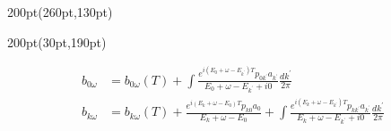 \begin{frame}
\begin{textblock*}{200pt}(260pt,130pt)
\end{textblock*}


\begin{textblock*}{200pt}(30pt,190pt)
\footnotesize

\begin{align}
b_{0\omega} & = b_{0\omega}(T)
 +\int\frac{e^{i(E_0+\omega-E_{k^\prime})T}p_{0k^\prime}a_{k^\prime}}
{E_0+\omega-E_{k^\prime} + i0} \frac{dk^\prime}{2\pi} \nonumber\\
b_{k\omega} & = b_{k\omega}(T)
 +\frac{e^{i(E_k+\omega-E_0)T}p_{k0}a_0}{E_k+\omega-E_0}
 +\int\frac{e^{i(E_k+\omega-E_{k^\prime})T}p_{kk^\prime}a_{k^\prime}}
{E_k+\omega-E_{k^\prime} + i0} \frac{dk^\prime}{2\pi} \nonumber
\end{align}



\end{textblock*}
\end{frame}
